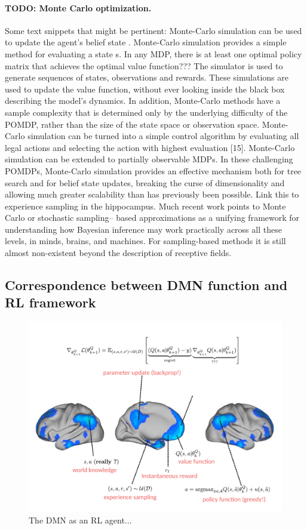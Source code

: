 \documentclass[10pt,letterpaper]{article}
\begin{document}
\paragraph{TODO: Monte Carlo optimization.}
Some text snippets that might be pertinent:
Monte-Carlo simulation can be used to update the agent’s belief state
\citep{silver2010monte}.
Monte-Carlo simulation provides a simple method for evaluating
a state s.
In any MDP, there is at least one optimal policy matrix that
achieves the optimal value function???
The simulator is used to generate sequences of states, observations and rewards. These simulations are used to update the value function, without ever looking inside the black box describing the model’s dynamics. In addition, Monte-Carlo methods have a sample complexity that is determined only by the underlying difficulty of the POMDP, rather than the size of the state space or observation space.
Monte-Carlo simulation can be turned into a simple control algorithm by evaluating all legal actions and selecting the action with highest evaluation [15]. Monte-Carlo simulation can be extended to partially observable MDPs.
In these challenging POMDPs, Monte-Carlo simulation provides an effective mechanism both for tree search and for belief state updates, breaking the curse of dimensionality and allowing much greater scalability than has previously been possible.
Link this to experience sampling in the hippocampus.
Much recent work points to Monte Carlo or stochastic sampling– based approximations as a unifying framework for understanding how Bayesian inference may work practically across all these levels, in minds, brains, and machines.
For sampling-based methods it is still almost non-existent beyond the description of receptive fields.


\subsection{Correspondence between DMN function and RL framework}
\begin{figure}[!h]
  \includegraphics[width=.9\linewidth]{rl_process_chart.pdf}
  \caption{The DMN as an RL agent...}
  \label{fig:rl_process_chart}
\end{figure}
\end{document}

